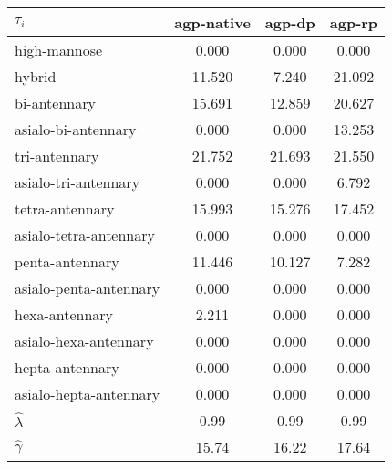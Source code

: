 \begin{table}
    \centering
    \small
    \begin{tabular}{l SSS}
        \toprule
        $\tau_i$ & {agp-native} & {agp-dp} & {agp-rp}\\
        \midrule
        high-mannose & 0.000 & 0.000 & 0.000\\
        hybrid & 11.520 & 7.240 & 21.092\\
        bi-antennary & 15.691 & 12.859 & 20.627\\
        asialo-bi-antennary & 0.000 & 0.000 & 13.253\\
        tri-antennary & 21.752 & 21.693 & 21.550\\
        asialo-tri-antennary & 0.000 & 0.000 & 6.792\\
        tetra-antennary & 15.993 & 15.276 & 17.452\\
        asialo-tetra-antennary & 0.000 & 0.000 & 0.000\\
        penta-antennary & 11.446 & 10.127 & 7.282\\
        asialo-penta-antennary & 0.000 & 0.000 & 0.000\\
        hexa-antennary & 2.211 & 0.000 & 0.000\\
        asialo-hexa-antennary & 0.000 & 0.000 & 0.000\\
        hepta-antennary & 0.000 & 0.000 & 0.000\\
        asialo-hepta-antennary & 0.000 & 0.000 & 0.000\\
        \midrule
        ${\hat \lambda}$ & 0.99 & 0.99 & 0.99\\
        ${\hat \gamma}$ & 15.74 & 16.22 & 17.64\\
        \bottomrule
    \end{tabular}
\end{table}